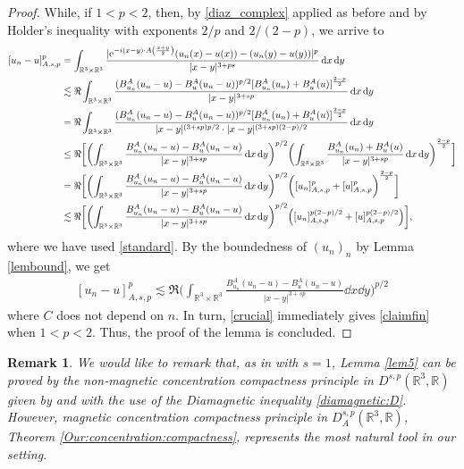\documentclass[leqno,11pt]{amsart}
\newcommand{\R}{\mathbb R}
\numberwithin{equation}{section}
\newtheorem{remark}[theorem]{Remark}
\def\e{{\rm e}}
\newcommand{\expAminus}{\e^{-i(x-y)\cdot A\left(\frac{x+y}{2}\right)}}
\begin{document}
\begin{proof}
While, if $1<p<2$, then, by \eqref{diaz_complex} 
applied as before and by Holder's inequality with exponents $2/p$
and $2/(2-p)$,  we arrive to 
{\small$$\begin{aligned}
    [u_n-u]_{A,s,p}^p           &=\int_{\R^3\times \R^3}\frac{|\expAminus(u_n(x)-u(x))-(u_n(y)-u(y))|^p}{|x-y|^{3+ps}}\dd x\dd y\\
    &\lesssim \Re \int_{\R^3\times \R^3}\frac{(B^A_{u_n}(u_n-u)-B^A_{u}(u_n-u))^{p/2}[B^A_{u_n}(u_n)+B^A_{u}(u)]^{\frac{2-p}{2}}}{|x-y|^{3+sp}}\dd x \dd y\\
    &= \Re \int_{\R^3\times \R^3}\frac{(B^A_{u_n}(u_n-u)-B^A_{u}(u_n-u))^{p/2}[B^A_{u_n}(u_n)+B^A_{u}(u)]^{\frac{2-p}{2}}}{|x-y|^{(3+sp)p/2}\cdot |x-y|^{(3+sp)(2-p)/2}}\dd x \dd y\\
    &\le \Re\biggl[\biggl( \int_{\R^3\times \R^3}\frac{B^A_{u_n}(u_n-u)-B^A_{u}(u_n-u)}{|x-y|^{3+sp}}\dd x \dd y\biggl)^{p/2}\biggl(\int_{\R^3\times \R^3}\frac{B^A_{u_n}(u_n)+B^A_{u}(u)}{|x-y|^{3+sp}}\dd x \dd y\biggr)^{\frac{2-p}{2}}\biggr]\\
    &= \Re\biggl[\biggl( \int_{\R^3\times \R^3}\frac{B^A_{u_n}(u_n-u)-B^A_{u}(u_n-u)}{|x-y|^{3+sp}}\dd x \dd y\biggl)^{p/2}\biggl([u_n]_{A,s,p}^p+[u]_{A,s,p}^p\biggr)^{\frac{2-p}{2}}\biggr]
    \\&  \lesssim\Re\biggl[\biggl( \int_{\R^3\times \R^3}\frac{B^A_{u_n}(u_n-u)-B^A_{u}(u_n-u)}{|x-y|^{3+sp}}\dd x \dd y\biggl)^{p/2} \left([u_n]_{A,s,p}^{p(2-p)/2}+[u]_{A,s,p}^{p(2-p)/2}\right)\biggr],
\end{aligned}$$}
where we have used \eqref{standard}.
By the boundedness of $(u_n)_n$ by Lemma \ref{lembound}, we get 
$$
    \begin{aligned} 
        [u_n-u]_{A,s,p}^p \lesssim \Re\biggl( \int_{\R^3\times \R^3}\frac{B^A_{u_n}(u_n-u)-B^A_{u}(u_n-u)}{|x-y|^{3+sp}}\dd x \dd y\biggl)^{p/2}
    \end{aligned}
$$ 
where $C$ does not depend on $n$.
In turn, \eqref{crucial} immediately gives \eqref{claimfin} when $1<p<2$.
Thus, the proof of the lemma is concluded.
\end{proof}

\begin{remark}
We would like to remark that, as in \cite{bfk} with $s=1$, Lemma \ref{lem5} can be proved by the non-magnetic concentration compactness principle in $D^{s,p}(\R^3,\R)$ given by \cite[Theorem 1.1]{BonderSaintierSilva} and with the use of the Diamagnetic inequality \eqref{diamagnetic:D}. However, magnetic concentration compactness principle in $D^{s,p}_A(\R^3,\R)$, Theorem \ref{Our:concentration:compactness}, represents the most natural tool in our setting.
\end{remark}
\end{document}
